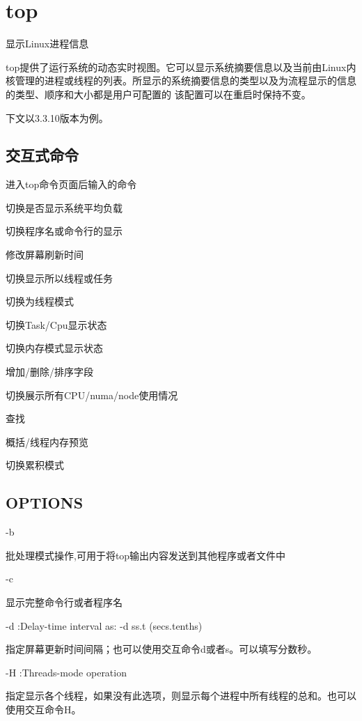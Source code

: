 \section{top}
\label{chap:linux_top}

显示Linux进程信息

top提供了运行系统的动态实时视图。它可以显示系统摘要信息以及当前由Linux内核管理的进程或线程的列表。所显示的系统摘要信息的类型以及为流程显示的信息的类型、顺序和大小都是用户可配置的
该配置可以在重启时保持不变。


下文以3.3.10版本为例。

\subsection{交互式命令}

进入top命令页面后输入的命令

     切换是否显示系统平均负载

     切换程序名或命令行的显示

     修改屏幕刷新时间

     切换显示所以线程或任务

     切换为线程模式

     切换Task/Cpu显示状态

     切换内存模式显示状态

     增加/删除/排序字段

   切换展示所有CPU/numa/node使用情况

    查找

  概括/线程内存预览

    切换累积模式


\subsection{OPTIONS}

-b  \par
\qquad 批处理模式操作,可用于将top输出内容发送到其他程序或者文件中

-c \par 
\qquad 显示完整命令行或者程序名

-d :Delay-time interval as:  -d ss.t (secs.tenths)  \par 
\qquad  指定屏幕更新时间间隔；也可以使用交互命令d或者s。可以填写分数秒。

-H  :Threads-mode operation \par
\qquad  指定显示各个线程，如果没有此选项，则显示每个进程中所有线程的总和。也可以使用交互命令H。

